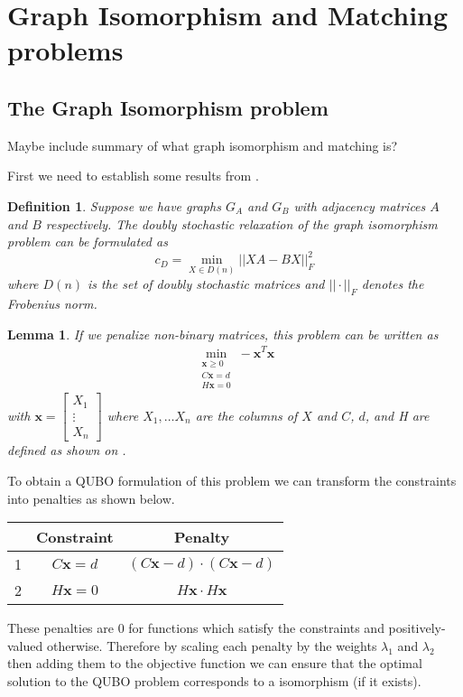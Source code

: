 \documentclass{article}
\newtheorem{lem}[prop]{Lemma}
\newtheorem{defn}[prop]{Definition}
\begin{document}
\section{Graph Isomorphism and Matching problems}
\subsection{The Graph Isomorphism problem}
\colorbox{BurntOrange}{Maybe include summary of what graph isomorphism and matching is?}

First we need to establish some results from \autocite{klus2023continuous}.
\begin{defn}\label{def:1}
    \cite[p.~6]{klus2023continuous} Suppose we have graphs \(G_A\) and \(G_B\) with adjacency matrices \(A\) and \(B\) respectively. The doubly stochastic relaxation of the graph isomorphism problem can be formulated as
    \begin{equation*}
        c_D = \min_{X \in D(n)} ||XA - BX||^2_F
    \end{equation*}
    where \(D(n)\) is the set of doubly stochastic matrices and \(||\cdot||_F\) denotes the Frobenius norm.
\end{defn}

\begin{lem}
    \cite[p.~13]{klus2023continuous} If we penalize non-binary matrices, this problem can be written as \begin{align*}
    \min_{\substack{\mathbf{x}\geq 0 \\ C\mathbf{x} = d \\ H\mathbf{x} = 0}} -\mathbf{x}^T \mathbf{x}
    \end{align*}
    with \(\mathbf{x} = \begin{bmatrix}
        X_1 \\
        \vdots \\
        X_n
    \end{bmatrix}\) where \(X_1, \dots X_n\) are the columns of \(X\) and \(C\), \(d\), and H are defined as shown on \cite[p.~8]{klus2023continuous}.
\end{lem}

\noindent To obtain a QUBO formulation of this problem we can transform the constraints into penalties as shown below.
\begin{center}
\begin{tabular}{ |c|c|c| } 
 \hline
   & Constraint  & Penalty \\ 
 \hline
 1 & \(C\mathbf{x} = d\) & \((C\mathbf{x} - d)\cdot(C\mathbf{x} - d)\) \\ 
 2 & \(H\mathbf{x} = 0\) & \(H \mathbf{x} \cdot H \mathbf{x} \) \\ 
 \hline
\end{tabular}
\end{center}
These penalties are 0 for functions which satisfy the constraints and positively-valued otherwise. Therefore by scaling each penalty by the weights \(\lambda_1\) and \(\lambda_2\) then adding them to the objective function we can ensure that the optimal solution to the QUBO problem corresponds to a isomorphism (if it exists).\\
\end{document}
